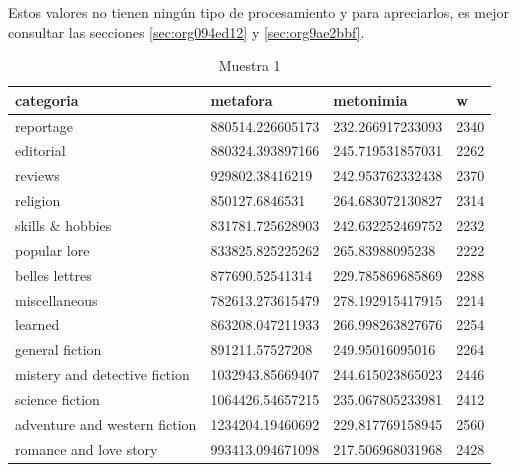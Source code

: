 \documentclass[12pt,letterpaper,twoside]{article}
\begin{document}
Estos valores no tienen ningún tipo de procesamiento y para apreciarlos, es mejor
consultar las secciones \ref{sec:org094ed12} y \ref{sec:org9ae2bbf}.
\begin{center}
    \begin{longtable}{| p{} | p{} | p{}|p{}|}
    \caption{Muestra 1}
    \hline
        categoria & metafora & metonimia & w \\ \hline
        reportage & 880514.226605173 & 232.266917233093 & 2340 \\ \hline
        editorial & 880324.393897166 & 245.719531857031 & 2262 \\ \hline
        reviews & 929802.38416219 & 242.953762332438 & 2370 \\ \hline
        religion & 850127.6846531 & 264.683072130827 & 2314 \\ \hline
        skills \& hobbies & 831781.725628903 & 242.632252469752 & 2232 \\ \hline
        popular lore & 833825.825225262 & 265.83988095238 & 2222 \\ \hline
        belles lettres & 877690.52541314 & 229.785869685869 & 2288 \\ \hline
        miscellaneous & 782613.273615479 & 278.192915417915 & 2214 \\ \hline
        learned & 863208.047211933 & 266.998263827676 & 2254 \\ \hline
        general fiction & 891211.57527208 & 249.95016095016 & 2264 \\ \hline
        mistery and detective fiction & 1032943.85669407 & 244.615023865023 & 2446 \\ \hline
        science fiction & 1064426.54657215 & 235.067805233981 & 2412 \\ \hline
        adventure and western fiction & 1234204.19460692 & 229.817769158945 & 2560 \\ \hline
        romance and love story & 993413.094671098 & 217.506968031968 & 2428 \\ \hline
\end{longtable}
\label{muestra1}
\end{center}
\end{document}
